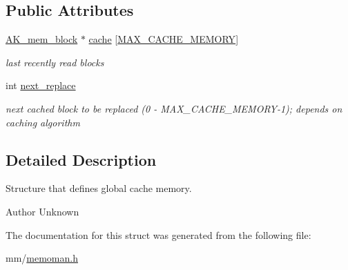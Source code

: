 \subsection*{Public Attributes}
\begin{DoxyCompactItemize}
\item 
\mbox{\label{structAK__db__cache_a77c58d95c53cc436131020502bdf9e9a}} 
\hyperlink{structAK__mem__block}{A\+K\+\_\+mem\+\_\+block} $\ast$ \hyperlink{structAK__db__cache_a77c58d95c53cc436131020502bdf9e9a}{cache} \mbox{[}\hyperlink{constants_8h_ac304f9fc596a8d4670ca626d0b671314}{M\+A\+X\+\_\+\+C\+A\+C\+H\+E\+\_\+\+M\+E\+M\+O\+RY}\mbox{]}
\begin{DoxyCompactList}\small\item\em last recently read blocks \end{DoxyCompactList}\item 
\mbox{\label{structAK__db__cache_a8bade287ccc6bb581d0ad793d6438eb0}} 
int \hyperlink{structAK__db__cache_a8bade287ccc6bb581d0ad793d6438eb0}{next\+\_\+replace}
\begin{DoxyCompactList}\small\item\em next cached block to be replaced (0 -\/ M\+A\+X\+\_\+\+C\+A\+C\+H\+E\+\_\+\+M\+E\+M\+O\+R\+Y-\/1); depends on caching algorithm \end{DoxyCompactList}\end{DoxyCompactItemize}


\subsection{Detailed Description}
Structure that defines global cache memory. 

\begin{DoxyAuthor}{Author}
Unknown 
\end{DoxyAuthor}


The documentation for this struct was generated from the following file\+:\begin{DoxyCompactItemize}
\item 
mm/\hyperlink{memoman_8h}{memoman.\+h}\end{DoxyCompactItemize}
